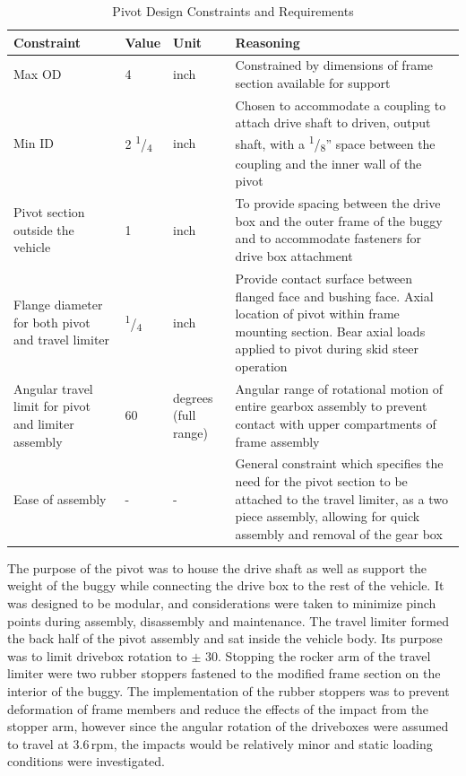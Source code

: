 \begin{table}[H]
 \centering
 \caption{Pivot Design Constraints and Requirements}
 \begin{tabular}{| p{4cm}lp{2cm}p{7cm} |} \hline 
 Constraint & Value & Unit & Reasoning \\ \hline
 Max OD & 4 & inch & Constrained by dimensions of frame section available for support \\
 Min ID & 2 \textsuperscript{1}/\textsubscript{4} & inch & Chosen to accommodate a coupling to attach drive shaft to driven, output shaft, with a \textsuperscript{1}/\textsubscript{8}'' space between the coupling and the inner wall of the pivot \\
 Pivot section outside the vehicle & 1 & inch & To provide spacing between the drive box and the outer frame of the buggy and to accommodate fasteners for drive box attachment \\
 Flange diameter for both pivot and travel limiter & \textsuperscript{1}/\textsubscript{4} & inch & Provide contact surface between flanged face and bushing face. Axial location of pivot within frame mounting section. Bear axial loads applied to pivot during skid steer operation \\
 Angular travel limit for pivot and limiter assembly & 60 & degrees (full range) & Angular range of rotational motion of entire gearbox assembly to prevent contact with upper compartments of frame assembly \\
 Ease of assembly & - & - & General constraint which specifies the need for the pivot section to be attached to the travel limiter, as a two piece assembly, allowing for quick assembly and removal of the gear box \\ \hline
 \end{tabular}
 \label{tab:pivot_const}
 \end{table}

The purpose of the pivot was to house the drive shaft as well as support the weight of the buggy while connecting the drive box to the rest of the vehicle. It was designed to be modular, and considerations were taken to minimize pinch points during assembly, disassembly and maintenance. The travel limiter formed the back half of the pivot assembly and sat inside the vehicle body. Its purpose was to limit drivebox rotation to $\pm$ 30\degree. Stopping the rocker arm of the travel limiter were two rubber stoppers fastened to the modified frame section on the interior of the buggy. The implementation of the rubber stoppers was to prevent deformation of frame members and reduce the effects of the impact from the stopper arm, however since the angular rotation of the driveboxes were assumed to travel at 3.6\,rpm, the impacts would be relatively minor and static loading conditions were investigated.  

